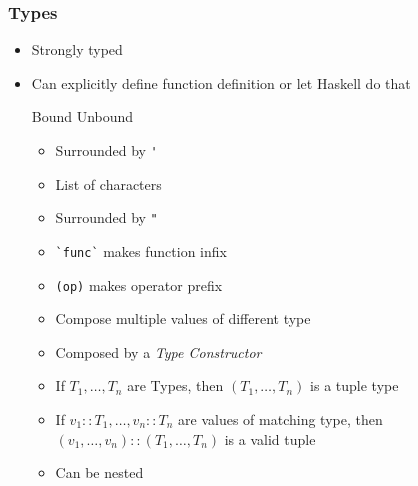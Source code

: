 \subsubsection{Types}
\begin{itemize}
    \item Strongly typed
    \item Can explicitly define function definition or let Haskell do that
        \begin{itemize}
             Bound
             Unbound
        \end{itemize}
        \begin{itemize}
            \item Surrounded by \verb+'+
        \end{itemize}
        \begin{itemize}
            \item List of characters
            \item Surrounded by \verb+"+
        \end{itemize}
        \begin{itemize}
             Binary function which is used infix
            \item \verb+`func`+ makes function infix
            \item \verb+(op)+ makes operator prefix
        \end{itemize}
        \begin{itemize}
            \item Compose multiple values of different type
            \item Composed by a \textit{Type Constructor}
            \item If $T_1, \dots, T_n$ are Types, then $(T_1, \dots , T_n)$ is a tuple type
            \item If $v_1 :: T_1, \dots, v_n :: T_n$ are values of matching type, then $(v_1, \dots , v_n) :: (T_1, \dots , T_n)$ is a valid tuple
            \item Can be nested
        \end{itemize}
\end{itemize}

